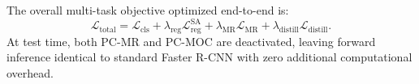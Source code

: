The overall multi-task objective optimized end-to-end is:
\begin{equation}
\mathcal{L}_{\mathrm{total}} = \mathcal{L}_{\mathrm{cls}} + \lambda_{\mathrm{reg}} \mathcal{L}_{\mathrm{reg}}^{\mathrm{SA}} + \lambda_{\mathrm{MR}} \mathcal{L}_{\mathrm{MR}} + \lambda_{\mathrm{distill}} \mathcal{L}_{\mathrm{distill}}.
\label{eq:l_total}
\end{equation}
At test time, both PC-MR and PC-MOC are deactivated, leaving forward inference identical to standard Faster R-CNN with zero additional computational overhead.
